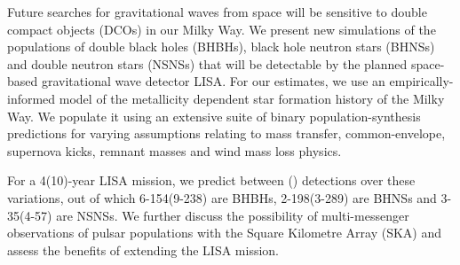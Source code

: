 Future searches for gravitational waves from space will be sensitive to double compact objects (DCOs) in our Milky Way. We present new simulations of the populations of double black holes (BHBHs), black hole neutron stars (BHNSs) and double neutron stars (NSNSs) that will be detectable by the planned space-based gravitational wave detector LISA. 
%
For our estimates, we use an empirically-informed model of the metallicity dependent star formation history of the Milky Way. We populate it using an extensive suite of binary population-synthesis predictions for varying assumptions relating to mass transfer, common-envelope, supernova kicks, remnant masses and wind mass loss physics. 


For a 4(10)-year LISA mission, we predict between \rangeFourYear{}(\rangeTenYear{}) detections over these variations, out of which 6-154(9-238) are BHBHs, 2-198(3-289) are BHNSs and 3-35(4-57) are NSNSs.
%
  We further discuss the possibility of multi-messenger observations of pulsar populations with the Square Kilometre Array (SKA) and assess the benefits of extending the LISA mission. 

